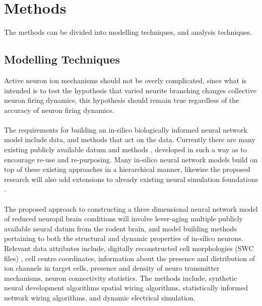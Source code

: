 \documentclass[a4paper,11pt]{article}
\begin{document}

\section{Methods}

The methods can be divided into modelling techniques, and analysis techniques.

\subsection{Modelling Techniques}
Active neuron ion mechanisms should not be overly complicated, since what is intended is to test the hypothesis that varied neurite branching changes collective neuron firing dynamics, this hypothesis should remain true regardless of the accuracy of neuron firing dynamics.\\
\\
The requirements for building an in-silico biologically informed neural network model include data, and methods that act on the data. Currently there are many existing publicly available datum \cite{ascoli2007neuromorpho} and methods \cite{hines2009neuron} \cite{hines2008translating}\cite{migliore2014distributed}, developed in such a way as to encourage re-use and re-purposing. Many in-silico neural network models build on top of these existing approaches in a hierarchical manner, likewise the proposed research will also add extensions to already existing neural simulation foundations \cite{carnevale2006neuron}\cite{close}.\\
\\
The proposed approach to constructing a three dimensional neural network model of reduced neuropil brain conditions will involve lever-aging multiple publicly available neural datum from the rodent brain, and model building methods pertaining to both the structural and dynamic properties of in-silico neurons. Relevant data attributes include, digitally reconstructed cell morphologies (SWC files) \cite{ascoli2007neuromorpho}, cell centre coordinates, information about the presence and distribution of ion channels in target cells, presence and density of neuro transmitter mechanisms, neuron connectivity statistics. The methods include, synthetic neural development algorithms spatial wiring algorithms, statistically informed network wiring algorithms, and dynamic electrical simulation.\\
\end{document}
